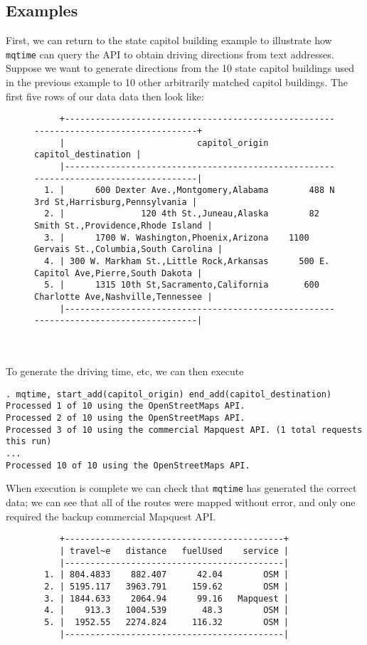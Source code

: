 \documentclass[11pt]{article}
\begin{document}
\subsection{Examples}
First, we can return to the state capitol building example to illustrate how \verb|mqtime| can query the API to obtain driving directions from text addresses. Suppose we want to generate directions from the 10 state capitol buildings used in the previous example to 10 other arbitrarily matched capitol buildings. The first five rows of our data data then look like:
\begin{figure}[htbp]
{\footnotesize
\begin{verbatim}
     +-------------------------------------------------------------------------------------+
     |                          capitol_origin                         capitol_destination |
     |-------------------------------------------------------------------------------------|
  1. |      600 Dexter Ave.,Montgomery,Alabama        488 N 3rd St,Harrisburg,Pennsylvania |
  2. |               120 4th St.,Juneau,Alaska        82 Smith St.,Providence,Rhode Island |
  3. |      1700 W. Washington,Phoenix,Arizona    1100 Gervais St.,Columbia,South Carolina |
  4. | 300 W. Markham St.,Little Rock,Arkansas      500 E. Capitol Ave,Pierre,South Dakota |
  5. |      1315 10th St,Sacramento,California       600 Charlotte Ave,Nashville,Tennessee |
     |-------------------------------------------------------------------------------------|
\end{verbatim}
}
\end{figure}
\\ \\
To generate the driving time, etc, we can then execute
\begin{center}
\begin{verbatim}
. mqtime, start_add(capitol_origin) end_add(capitol_destination)
Processed 1 of 10 using the OpenStreetMaps API.
Processed 2 of 10 using the OpenStreetMaps API.
Processed 3 of 10 using the commercial Mapquest API. (1 total requests this run)
...
Processed 10 of 10 using the OpenStreetMaps API.
\end{verbatim}
\end{center}
When execution is complete we can check that \verb|mqtime| has generated the correct data; we can see that all of the routes were mapped without error, and only one required the backup commercial Mapquest API. 

\begin{figure}[htbp]
\begin{center}
{\footnotesize
\begin{verbatim}
     +-------------------------------------------+
     | travel~e   distance   fuelUsed    service |
     |-------------------------------------------|
  1. | 804.4833    882.407      42.04        OSM |
  2. | 5195.117   3963.791     159.62        OSM |
  3. | 1844.633    2064.94      99.16   Mapquest |
  4. |    913.3   1004.539       48.3        OSM |
  5. |  1952.55   2274.824     116.32        OSM |
     |-------------------------------------------|
\end{verbatim}
}
\end{center}
\end{figure}
\clearpage
\end{document}
